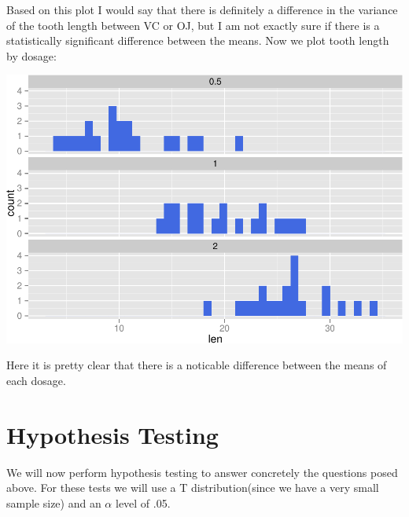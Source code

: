 \documentclass[]{article}
\newenvironment{Shaded}{\begin{snugshade}}{\end{snugshade}}
\newcommand{\KeywordTok}[1]{\textcolor[rgb]{0.13,0.29,0.53}{\textbf{{#1}}}}
\newcommand{\DataTypeTok}[1]{\textcolor[rgb]{0.13,0.29,0.53}{{#1}}}
\newcommand{\DecValTok}[1]{\textcolor[rgb]{0.00,0.00,0.81}{{#1}}}
\newcommand{\FloatTok}[1]{\textcolor[rgb]{0.00,0.00,0.81}{{#1}}}
\newcommand{\StringTok}[1]{\textcolor[rgb]{0.31,0.60,0.02}{{#1}}}
\newcommand{\NormalTok}[1]{{#1}}
\begin{document}
Based on this plot I would say that there is definitely a difference in
the variance of the tooth length between VC or OJ, but I am not exactly
sure if there is a statistically significant difference between the
means. Now we plot tooth length by dosage:

\begin{Shaded}
\end{Shaded}

\includegraphics{SI-Proj2_files/figure-latex/unnamed-chunk-2-1.pdf}

Here it is pretty clear that there is a noticable difference between the
means of each dosage.

\section{Hypothesis Testing}

We will now perform hypothesis testing to answer concretely the
questions posed above. For these tests we will use a T
distribution(since we have a very small sample size) and an \(\alpha\)
level of .05.
\end{document}
